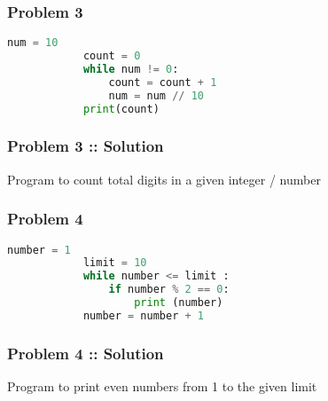 \documentclass[14pt]{beamer}
\begin{document}
    \begin{frame}[containsverbatim]
        \frametitle{Problem 3}
        \begin{lstlisting}[language=Python]
            num = 10
            count = 0
            while num != 0:
                count = count + 1
                num = num // 10
            print(count)
        \end{lstlisting}
    \end{frame}

    \begin{frame}
        \frametitle{Problem 3 :: Solution}
        Program to count total digits in a given integer / number
    \end{frame}
    \begin{frame}[containsverbatim]
        \frametitle{Problem 4}
        \begin{lstlisting}[language=Python]
            number = 1
            limit = 10
            while number <= limit :
                if number % 2 == 0:
                    print (number)
            number = number + 1
        \end{lstlisting}
    \end{frame}
    \begin{frame}
        \frametitle{Problem 4 :: Solution}
        Program to print even numbers from 1 to the given limit
    \end{frame}
\end{document}
